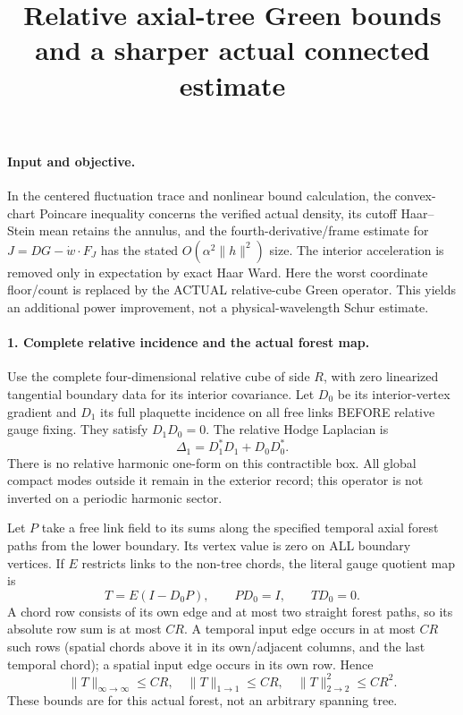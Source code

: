\documentclass[11pt]{article}
\title{Relative axial-tree Green bounds and a sharper actual connected estimate}\author{}\date{}
\begin{document}
\maketitle
\paragraph{Input and objective.}
In the centered fluctuation trace and nonlinear bound calculation, the convex-chart Poincare inequality concerns the verified
actual density, its cutoff Haar--Stein mean retains the annulus, and the
fourth-derivative/frame estimate for $J=DG-\dot w\cdot F_J$ has the stated
$O(\alpha^2\|h\|^2)$ size. The interior acceleration is removed only in
expectation by exact Haar Ward. Here the worst coordinate floor/count is
replaced by the ACTUAL relative-cube Green operator. This yields an additional
power improvement, not a physical-wavelength Schur estimate.

\paragraph{1. Complete relative incidence and the actual forest map.}
Use the complete four-dimensional relative cube of side $R$, with zero
linearized tangential boundary data for its interior covariance. Let $D_0$
be its interior-vertex gradient and $D_1$ its full plaquette incidence on all
free links BEFORE relative gauge fixing. They satisfy $D_1D_0=0$.
The relative Hodge Laplacian is
\[
 \Delta_1=D_1^*D_1+D_0D_0^*.
\]
There is no relative harmonic one-form on this contractible box. All global
compact modes outside it remain in the exterior record; this operator is
not inverted on a periodic harmonic sector.

Let $P$ take a free link field to its sums along the specified temporal axial
forest paths from the lower boundary. Its vertex value is zero on ALL boundary
vertices. If $E$ restricts links to the non-tree chords, the literal gauge
quotient map is
\[
 T=E(I-D_0P),\qquad P D_0=I,\qquad T D_0=0.                             \tag{1}
\]
A chord row consists of its own edge and at most two straight forest paths,
so its absolute row sum is at most $CR$. A temporal input edge occurs in
at most $CR$ such rows (spatial chords above it in its own/adjacent columns,
and the last temporal chord); a spatial input edge occurs in its own row.
Hence
\[
 \|T\|_{\infty\to\infty}\le CR,\quad
 \|T\|_{1\to1}\le CR,\quad \|T\|_{2\to2}^2\le CR^2.                   \tag{2}
\]
These bounds are for this actual forest, not an arbitrary spanning tree.
\end{document}
